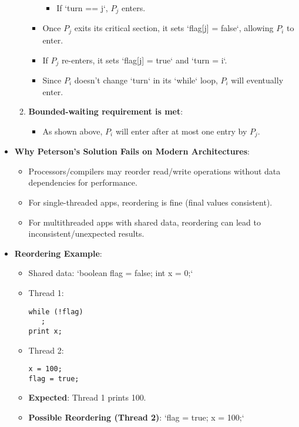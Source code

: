 \begin{itemize}
\begin{enumerate}
\begin{itemize}
\begin{itemize}
                \item If `turn == j`, $P_j$ enters.
            \end{itemize}
            \item Once $P_j$ exits its critical section, it sets `flag[j] = false`, allowing $P_i$ to enter.
            \item If $P_j$ re-enters, it sets `flag[j] = true` and `turn = i`.
            \item Since $P_i$ doesn't change `turn` in its `while` loop, $P_i$ will eventually enter.
        \end{itemize}
        \item \textbf{Bounded-waiting requirement is met}:
        \begin{itemize}
            \item As shown above, $P_i$ will enter after at most one entry by $P_j$.
        \end{itemize}
    \end{enumerate}
    \item \textbf{Why Peterson's Solution Fails on Modern Architectures}:
    \begin{itemize}
        \item Processors/compilers may reorder read/write operations without data dependencies for performance.
        \item For single-threaded apps, reordering is fine (final values consistent).
        \item For multithreaded apps with shared data, reordering can lead to inconsistent/unexpected results.
    \end{itemize}
    \item \textbf{Reordering Example}:
    \begin{itemize}
        \item Shared data: `boolean flag = false; int x = 0;`
        \item Thread 1:
\begin{verbatim}
while (!flag)
   ;
print x;
\end{verbatim}
        \item Thread 2:
\begin{verbatim}
x = 100;
flag = true;
\end{verbatim}
        \item \textbf{Expected}: Thread 1 prints 100.
        \item \textbf{Possible Reordering (Thread 2)}: `flag = true; x = 100;`
        \begin{itemize}

\end{itemize}
\end{itemize}
\end{itemize}
